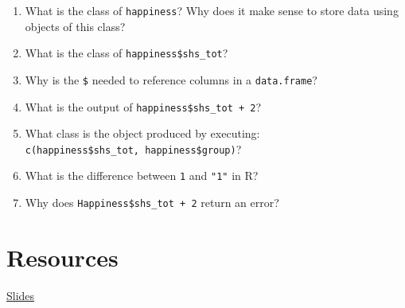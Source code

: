 \documentclass[
]{book}
\providecommand{\tightlist}{%
  \setlength{\itemsep}{0pt}\setlength{\parskip}{0pt}}
\begin{document}
\begin{enumerate}
\def\labelenumi{\arabic{enumi}.}
\tightlist
\item
  What is the class of \texttt{happiness}? Why does it make sense to store data using objects of this class?
\item
  What is the class of \texttt{happiness\$shs\_tot}?
\item
  Why is the \texttt{\$} needed to reference columns in a \texttt{data.frame}?
\item
  What is the output of \texttt{happiness\$shs\_tot\ +\ 2}?
\item
  What class is the object produced by executing: \texttt{c(happiness\$shs\_tot,\ happiness\$group)}?
\item
  What is the difference between \texttt{1} and \texttt{"1"} in R?
\item
  Why does \texttt{Happiness\$shs\_tot\ +\ 2} return an error?
\end{enumerate}

\hypertarget{resources}{%
\section{Resources}\label{resources}}

\href{../assets/documents/01-intro-to-r-1-slides.pdf}{Slides}

  
\end{document}
